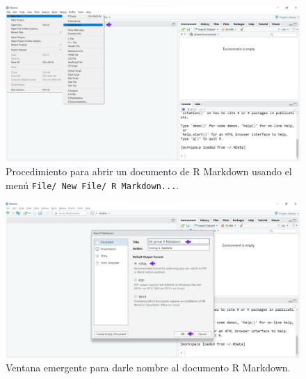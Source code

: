 \documentclass[
]{article}
\theoremstyle{definition}
\theoremstyle{definition}
\theoremstyle{definition}
\theoremstyle{definition}
\theoremstyle{remark}
\begin{document}
\begin{figure}

{\centering \includegraphics[width=1\linewidth]{figs/screenshots/abrir R Markdown 1} 

}

\caption{Procedimiento para abrir un documento de R Markdown usando el menú \texttt{File/\ New\ File/\ R\ Markdown...}.}\label{fig:figura23}
\end{figure}



\begin{figure}

{\centering \includegraphics[width=1\linewidth]{figs/screenshots/abrir R Markdown 2} 

}

\caption{Ventana emergente para darle nombre al documento R Markdown.}\label{fig:figura24}
\end{figure}
\end{document}
